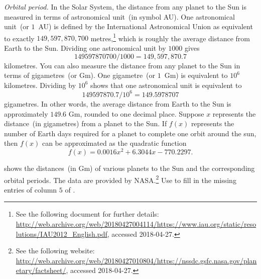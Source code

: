 \documentclass[a4paper,oneside,12pt]{article}
\begin{document}
\begin{problem}
\item\emph{Orbital period.}
  In the Solar System, the distance from any planet to the Sun is
  measured in terms of astronomical unit~(in symbol AU).  One
  astronomical unit~(or $1$~AU) is defined by the International
  Astronomical Union as equivalent to exactly $149,597,870,700$
  metres,\footnote{
    See the following document for further details:
    \url{http://web.archive.org/web/20180427004114/https://www.iau.org/static/resolutions/IAU2012_English.pdf},
    accessed 2018-04-27.
  }
  which is roughly the average distance from Earth to the Sun.
  Dividing one astronomical unit by $1000$ gives
  \begin{equation}
  \label{eqn:astronomical_unit_over_1000}
  149597870700 / 1000
  =
  149,597,870.7
  \end{equation}
  kilometres.  You can also measure the distance from any planet to
  the Sun in terms of gigametres~(or Gm).  One gigametre~(or $1$~Gm)
  is equivalent to $10^6$ kilometres.  Dividing
   by $10^6$ shows that
  one astronomical unit is equivalent to
  \[
  149597870.7 / 10^6
  =
  149.5978707
  \]
  gigametres.  In other words, the average distance from Earth to the
  Sun is approximately $149.6$ Gm, rounded to one decimal place.
  Suppose $x$ represents the distance~(in gigametres) from a planet to
  the Sun.  If $f(x)$ represents the number of Earth days required for
  a planet to complete one orbit around the sun, then $f(x)$ can be
  approximated as the quadratic function
  \begin{equation}
  \label{eqn:Earth_days_orbit_approximation}
  f(x)
  =
  0.0016x^2 + 6.3044x - 770.2297.
  \end{equation}
  \begin{packedenum}
  \item\label{subprob:planetary_orbit_quadratic}
     shows the distances~(in Gm) of
    various planets to the Sun and the corresponding orbital periods.
    The data are provided by NASA.\footnote{
      See the following website:
      \url{http://web.archive.org/web/20180427010804/https://nssdc.gsfc.nasa.gov/planetary/factsheet/},
      accessed 2018-04-27.
    }
    Use  to fill in the
    missing entries of column $5$ of
    .


\end{packedenum}
\end{problem}
\end{document}
